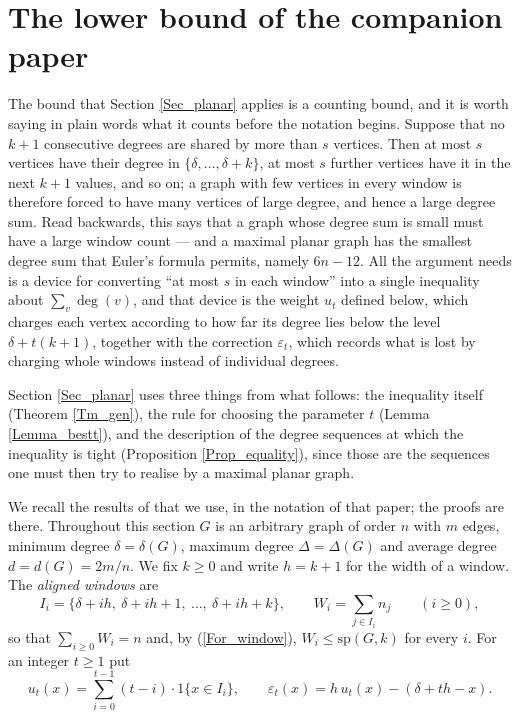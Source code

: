 \documentclass[10pt,a4paper]{article}
\begin{document}


\section{The lower bound of the companion paper}
\label{Sec_prelim}

The bound that Section \ref{Sec_planar} applies is a counting bound, and it is
worth saying in plain words what it counts before the notation begins. Suppose
that no $k+1$ consecutive degrees are shared by more than $s$ vertices. Then at
most $s$ vertices have their degree in $\{\delta ,\ldots ,\delta +k\}$, at most
$s$ further vertices have it in the next $k+1$ values, and so on; a graph with
few vertices in every window is therefore forced to have many vertices of large
degree, and hence a large degree sum. Read backwards, this says that a graph
whose degree sum is small must have a large window count --- and a maximal planar graph has the smallest degree sum that Euler's formula permits, namely
$6n-12$. All the argument needs is a device for converting ``at most $s$ in each
window'' into a single inequality about $\sum_{v}\deg (v)$, and that device is
the weight $u_{t}$ defined below, which charges each vertex according to how far
its degree lies below the level $\delta +t(k+1)$, together with the correction
$\varepsilon _{t}$, which records what is lost by charging whole windows instead
of individual degrees.

Section \ref{Sec_planar} uses three things from what follows: the inequality
itself (Theorem \ref{Tm_gen}), the rule for choosing the parameter $t$ (Lemma
\ref{Lemma_bestt}), and the description of the degree sequences at which the
inequality is tight (Proposition \ref{Prop_equality}), since those are the
sequences one must then try to realise by a maximal planar graph.



We recall the results of \cite{P1} that we use, in the notation of that paper; the proofs are there. Throughout
this section $G$ is an arbitrary graph of order $n$ with $m$ edges, minimum degree $\delta =\delta (G)$, maximum
degree $\Delta =\Delta (G)$ and average degree $d=d(G)=2m/n$. We fix $k\geq 0$ and write $h=k+1$ for the width of a
window. The \emph{aligned windows} are
\[
I_{i}=\{\delta +ih,\ \delta +ih+1,\ \ldots ,\ \delta +ih+k\},\qquad W_{i}=\sum_{j\in I_{i}}n_{j}%
\qquad (i\geq 0),
\]
so that $\sum_{i\geq 0}W_{i}=n$ and, by (\ref{For_window}), $W_{i}\leq \mathrm{sp}(G,k)$ for every
$i$. For an integer $t\geq 1$ put
\[
u_{t}(x)=\sum_{i=0}^{t-1}(t-i)\cdot 1\{x\in I_{i}\},\qquad \varepsilon _{t}(x)=h\,u_{t}%
(x)-\left( \delta +th-x\right) .
\]
\end{document}
